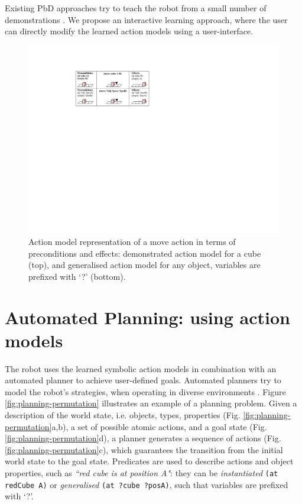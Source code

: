 Existing PbD approaches try to teach the robot from a small number of demonstrations \cite{orendt2016robot,abdo2013learning}. We propose an interactive learning approach, where the user can directly modify the learned action models using a user-interface.

  \begin{figure}[!h]
	\centering
	\includegraphics[width=0.7\linewidth]{figures/schema-logic}
	\caption{Action model representation of a move action in terms of preconditions and effects: demonstrated action model for a cube (top), and generalised action model for any object, variables are prefixed with `?' (bottom).}
	\label{fig:action}
\end{figure}

\section{Automated Planning: using action models}\label{sec:AP}
The robot uses the learned symbolic action models in combination with an automated planner to achieve user-defined goals. Automated planners try to model the robot's strategies, when operating in diverse environments \cite{ghallab2004automated}.
Figure \ref{fig:planning-permutation} illustrates an example of a planning problem. Given a description of the world state, i.e. objects, types, properties (Fig. \ref{fig:planning-permutation}a,b), a set of possible atomic actions, and a goal state (Fig. \ref{fig:planning-permutation}d), a planner generates a sequence of actions (Fig. \ref{fig:planning-permutation}c), which guarantees the transition from the initial world state to the goal state. Predicates are used to describe actions and object properties, such as \textit{``red cube is at position A"}: they can be \textit{instantiated} \texttt{(at redCube A)} or \textit{generalised} \texttt{(at ?cube ?posA)}, such that variables are prefixed with `?'.

